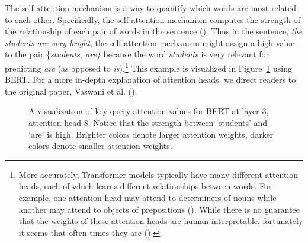 \documentclass[
  12pt,
  letterpaper,
]{scrreport}
\begin{document}
The self-attention mechanism is a way to quantify which words are most
related to each other. Specifically, the self-attention mechanism
computes the strength of the relationship of each pair of words in the
sentence (). Thus in the sentence, \emph{the students are very bright}, the
self-attention mechanism might assign a high value to the pair
\{\emph{students, are\}} because the word \emph{students} is very
relevant for predicting \emph{are} (as opposed to \emph{is}).\footnote{More
  accurately, Transformer models typically have many different attention
  heads, each of which learns different relationships between words. For
  example, one attention head may attend to determiners of nouns while
  another may attend to objects of prepositions
  (). While
  there is no guarantee that the weights of these attention heads are
  human-interpretable, fortunately it seems that often times they are
  ().} This
example is visualized in Figure~\ref{fig-attentionplot} using BERT. For
a more in-depth explanation of attention heads, we direct readers to the
original paper, Vaswani et al.
().

\begin{figure}[htbp]

\caption{\label{fig-attentionplot}A visualization of key-query attention
values for BERT at layer 3, attention head 8. Notice that the strength
between `students' and `are' is high. Brighter colors denote larger
attention weights, darker colors denote smaller attention weights.}


\end{figure}%
\end{document}

